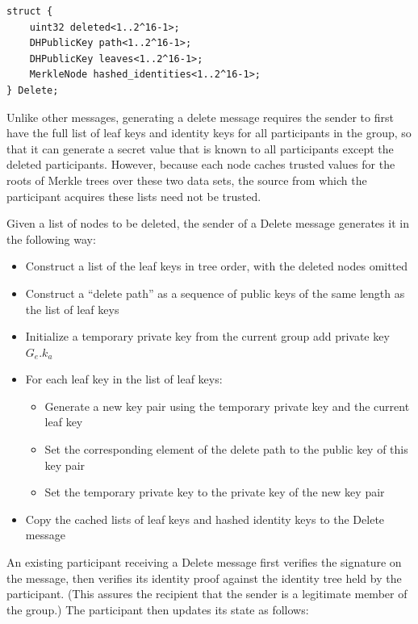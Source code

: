 \documentclass[11pt, oneside]{article}
\begin{document}
\begin{verbatim}
struct {
    uint32 deleted<1..2^16-1>;
    DHPublicKey path<1..2^16-1>;
    DHPublicKey leaves<1..2^16-1>;
    MerkleNode hashed_identities<1..2^16-1>;
} Delete;
\end{verbatim}

Unlike other messages, generating a delete message requires the sender to first have the full list of leaf keys and identity keys for all participants in the group, so that it can generate a secret value that is known to all participants except the deleted participants.  However, because each node caches trusted values for the roots of Merkle trees over these two data sets, the source from which the participant acquires these lists need not be trusted.

Given a list of nodes to be deleted, the sender of a Delete message generates it in the following way:

\begin{itemize}
\item{Construct a list of the leaf keys in tree order, with the deleted nodes omitted}
\item{Construct a ``delete path'' as a sequence of public keys of the same length as the list of leaf keys}
\item{Initialize a temporary private key from the current group add private key $G_e.k_a$}
\item{For each leaf key in the list of leaf keys:
	\begin{itemize}
	\item{Generate a new key pair using the temporary private key and the current leaf key}
	\item{Set the corresponding element of the delete path to the public key of this key pair}
	\item{Set the temporary private key to the private key of the new key pair}
	\end{itemize}
}
\item{Copy the cached lists of leaf keys and hashed identity keys to the Delete message}
\end{itemize}

An existing participant receiving a Delete message first verifies the signature on the message, then verifies its identity proof against the identity tree held by the participant.  (This assures the recipient that the sender is a legitimate member of the group.)  The participant then updates its state as follows:
\end{document}
